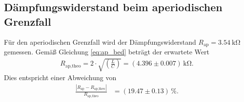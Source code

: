 \subsection{Dämpfungswiderstand beim aperiodischen Grenzfall}
Für den aperiodischen Grenzfall wird der Dämpfungswiderstand $R_\text{ap} = \qty{3.54}{\kilo\ohm}$ gemessen.
Gemäß Gleichung \eqref{eq:ap_bed} beträgt der erwartete Wert 
\begin{align}
    R_\text{ap,theo} = 2 \cdot \sqrt{\left(\frac{L}{C}\right)} =  (\num{4.396} \pm \num{0.007}) \, \unit{\kilo\ohm}.
\end{align}
Dies entspricht einer Abweichung von
\begin{align*}
    \frac{|R_\text{ap} - R_\text{ap,theo}|}{R_\text{ap,theo}} &= (\num[]{19.47} \pm \num[]{0.13}) \, \%.
\end{align*}
